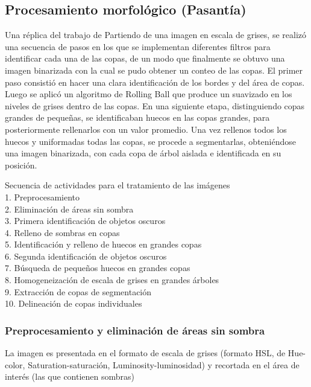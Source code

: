 \color{cyan} %
\subsection{Procesamiento morfológico (Pasantía)}
Una réplica del trabajo de \cite{ferreira_tree_2019}
Partiendo de una imagen en escala de grises, se realizó una secuencia de pasos en los que se implementan diferentes filtros para identificar cada una de las copas, de un modo que finalmente se obtuvo una imagen binarizada con la cual se pudo obtener un conteo de las copas. El primer paso consistió en hacer una clara identificación de los bordes y del área de copas. Luego se aplicó un algoritmo de Rolling Ball \cite{sternberg_biomedical_1983} que produce un suavizado en los niveles de grises dentro de las copas. En una siguiente etapa, distinguiendo copas grandes de pequeñas, se identificaban huecos en las copas grandes, para posteriormente rellenarlos con un valor promedio. Una vez rellenos todos los huecos y uniformadas todas las copas, se procede a segmentarlas, obteniéndose una imagen binarizada, con cada copa de árbol aislada e identificada en su posición.

Secuencia de actividades para el tratamiento de las imágenes\\
1. Preprocesamiento\\
2. Eliminación de áreas sin sombra\\
3. Primera identificación de objetos oscuros\\
4. Relleno de sombras en copas\\
5. Identificación y relleno de huecos en grandes copas\\
6. Segunda identificación de objetos oscuros\\
7. Búsqueda de pequeños huecos en grandes copas\\
8. Homogeneización de escala de grises en grandes árboles\\
9. Extracción de copas de segmentación\\
10.  Delineación de copas individuales\\

\subsubsection{Preprocesamiento y eliminación de áreas sin sombra}
La imagen es presentada en el formato de escala de grises (formato HSL, de Hue-color, Saturation-saturación, Luminosity-luminosidad) y recortada en el área de interés (las que contienen sombras)
